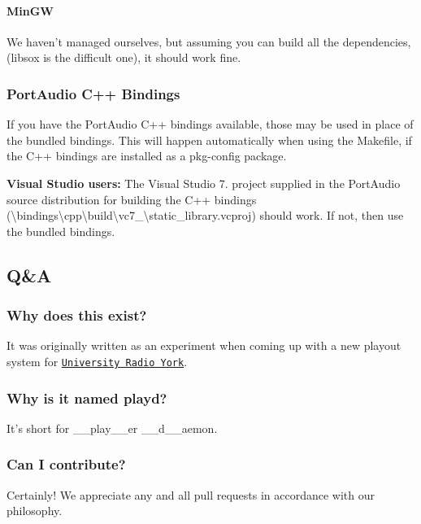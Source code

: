 \paragraph*{Min\+G\+W}

We haven't managed ourselves, but assuming you can build all the dependencies, (libsox is the difficult one), it should work fine.

\subsubsection*{Port\+Audio C++ Bindings}

If you have the Port\+Audio C++ bindings available, those may be used in place of the bundled bindings. This will happen automatically when using the Makefile, if the C++ bindings are installed as a pkg-\/config package.

{\bfseries Visual Studio users\+:} The Visual Studio 7. project supplied in the Port\+Audio source distribution for building the C++ bindings ({\ttfamily \textbackslash{}bindings\textbackslash{}cpp\textbackslash{}build\textbackslash{}vc7\+\_\textbackslash{}static\+\_\+library.\+vcproj}) should work. If not, then use the bundled bindings.

\subsection*{Q\&A}

\subsubsection*{Why does this exist?}

It was originally written as an experiment when coming up with a new playout system for \href{http://ury.org.uk}{\tt University Radio York}.

\subsubsection*{Why is it named {\ttfamily playd}?}

It's short for \+\_\+\+\_\+play\+\_\+\+\_\+er \+\_\+\+\_\+d\+\_\+\+\_\+aemon.

\subsubsection*{Can I contribute?}

Certainly! We appreciate any and all pull requests in accordance with our philosophy. 